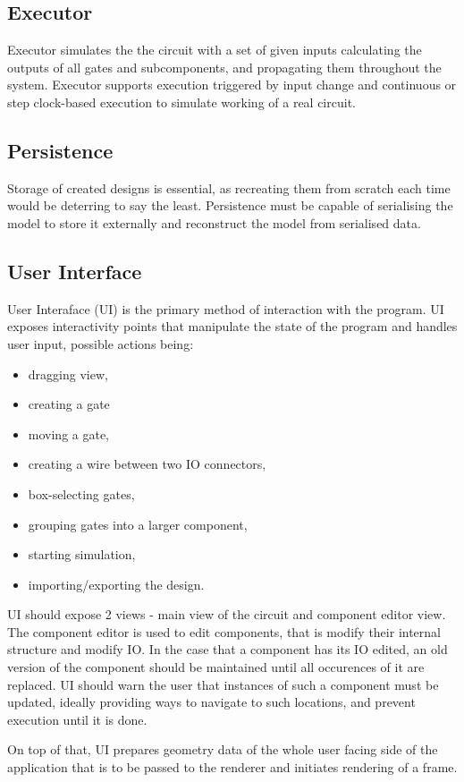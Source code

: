 \documentclass[12pt, a4paper]{article}
\newenvironment{itemlist}
{\begin{itemize}
  \setlength{\itemsep}{0pt}}
{\end{itemize}}
\begin{document}
\subsection{Executor}
Executor simulates the the circuit with a set of given inputs calculating the outputs of all gates
and subcomponents, and propagating them throughout the system. Executor supports execution triggered
by input change and continuous or step clock-based execution to simulate working of a real circuit.

\subsection{Persistence}
Storage of created designs is essential, as recreating them from scratch each time would be
deterring to say the least. Persistence must be capable of serialising the model to store it
externally and reconstruct the model from serialised data.

\subsection{User Interface}
User Interaface (UI) is the primary method of interaction with the program. UI exposes interactivity
points that manipulate the state of the program and handles user input, possible actions being:
\begin{itemlist}
\item dragging view,
\item creating a gate
\item moving a gate,
\item creating a wire between two IO connectors,
\item box-selecting gates,
\item grouping gates into a larger component,
\item starting simulation,
\item importing/exporting the design.
\end{itemlist}
UI should expose 2 views - main view of the circuit and component editor view. The component editor
is used to edit components, that is modify their internal structure and modify IO. In the case that
a component has its IO edited, an old version of the component should be maintained until all
occurences of it are replaced. UI should warn the user that instances of such a component must be
updated, ideally providing ways to navigate to such locations, and prevent execution until it is
done.

On top of that, UI prepares geometry data of the whole user facing side of the application that is
to be passed to the renderer and initiates rendering of a frame.
\end{document}
